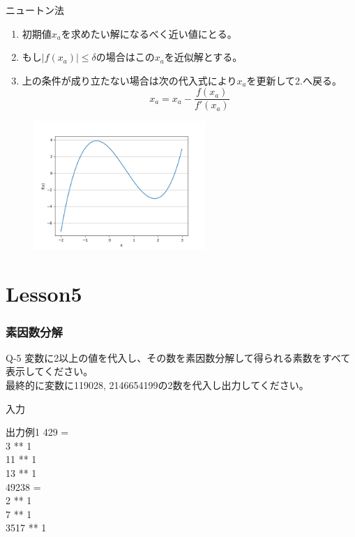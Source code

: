 \documentclass[dvipdfmx]{beamer}
\begin{document}
\begin{frame}
	\begin{itembox}[l]{ニュートン法}
		\begin{enumerate}
			\item 初期値$x_a$を求めたい解になるべく近い値にとる。
			\item もし$\left\lvert f(x_a) \right\lvert \leq \delta $の場合はこの$x_a$を近似解とする。
			\item 上の条件が成り立たない場合は次の代入式により$x_a$を更新して2.へ戻る。
				$$x_a = x_a - \frac{f(x_a)}{f'(x_a)}$$
		\end{enumerate}
	\end{itembox}
	\begin{figure}[h]
		\includegraphics[width=65mm]{Figure_1.png}
	\end{figure}
\end{frame}

\section{Lesson5}
\begin{frame}
	\frametitle{素因数分解}
	\begin{itembox}[l]{Q-5}
		変数に2以上の値を代入し、その数を素因数分解して得られる素数をすべて表示してください。\\
		最終的に変数に119028, 2146654199の2数を代入し出力してください。
	\end{itembox}
	\begin{block}{入力}
	\end{block}
	\begin{block}{出力例1}
		429 =\\
		3 ** 1\\
		11 ** 1\\
		13 ** 1\\
		49238 =\\
		2 ** 1\\
		7 ** 1\\
		3517 ** 1
	\end{block}
\end{frame}
\end{document}
